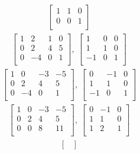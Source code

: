 \documentclass[12pt]{article}
\begin{document}
\begin{enumerate}
\begin{align*}
\begin{bmatrix}
        1 & 1 & 0\\
        0 & 0 & 1\\
      \end{bmatrix}
    \end{align*}
    \begin{align*}
      \begin{bmatrix}
        1  & 2  & 1 & 0\\
        0  & 2  & 4 & 5\\
        0  & -4 & 0 & 1\\
      \end{bmatrix},\
      \begin{bmatrix}
        1  & 0 & 0\\
        1  & 1 & 0\\
        -1 & 0 & 1\\
      \end{bmatrix}
    \end{align*}
    \begin{align*}
      \begin{bmatrix}
        1  & 0  & -3 & -5\\
        0  & 2  & 4  & 5\\
        0  & -4 & 0  & 1\\
      \end{bmatrix},\
      \begin{bmatrix}
        0  & -1 & 0\\
        1  & 1  & 0\\
        -1 & 0  & 1\\
      \end{bmatrix}
    \end{align*}
    \begin{align*}
      \begin{bmatrix}
        1  & 0  & -3 & -5\\
        0  & 2  & 4  & 5\\
        0  & 0  & 8  & 11\\
      \end{bmatrix},\
      \begin{bmatrix}
        0  & -1 & 0\\
        1  & 1  & 0\\
        1  & 2  & 1\\
      \end{bmatrix}
    \end{align*}
    \begin{align*}
      \begin{bmatrix}

\end{bmatrix}
\end{align*}
\end{enumerate}
\end{document}
